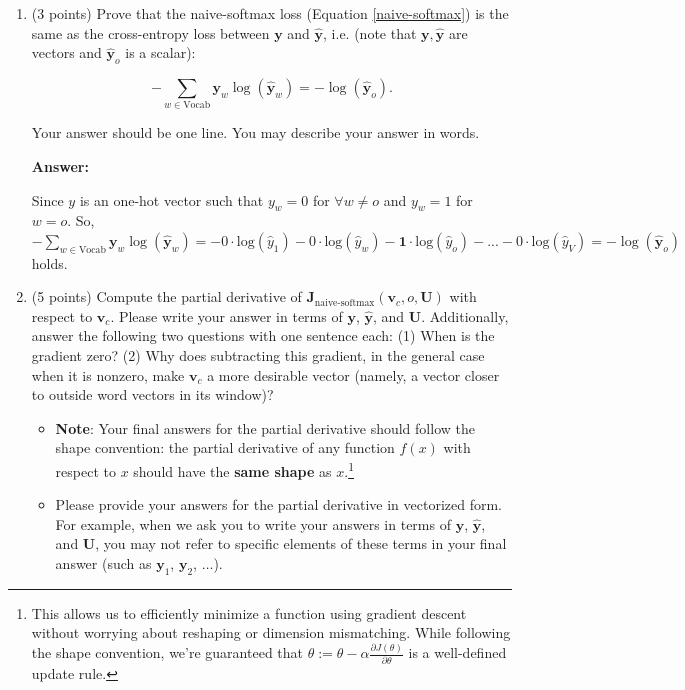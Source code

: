\documentclass{article}
\newenvironment{answer}{
    {\bf Answer:} \sf \begingroup\color{red}
}{\endgroup}%
\begin{document}
\clearpage 
\begin{enumerate}[label=(\alph*)]
\item (3 points) 
Prove that the naive-softmax loss (Equation \ref{naive-softmax}) is the same as the cross-entropy loss between $\bm y$ and $\hat{\bm y}$, i.e. (note that $\bm y, \hat{\bm y}$ are vectors and $\hat{\bm y}_o$ is a scalar):

\begin{equation}
-\sum_{w \in \text{Vocab}} \bm y_w \log(\hat{\bm y}_w) = - \log (\hat{\bm y}_o).
\end{equation}

Your answer should be one line. You may describe your answer in words.
\begin{shaded}
\begin{answer}
Since $y$ is an one-hot vector such that $y_w = 0$ for $\forall w \neq o$ and $y_w = 1$ for $w = o$. So, $-\sum_{w \in \text{Vocab}} \bm y_w \log(\hat{\bm y}_w) = - 0 \cdot \text{log} (\hat{y}_1) - 0 \cdot \text{log} (\hat{y}_w) - \bm 1 \cdot \text{log} (\hat{y}_o) - ... - 0 \cdot \text{log} (\hat{y}_V) = - \log (\hat{\bm y}_o)$ holds.
\end{answer}
\end{shaded}

\item (5 points) Compute the partial derivative of $\bm J_{\text{naive-softmax}}(\bm v_c, o, \bm U)$ with respect to $\bm v_c$. Please write your answer in terms of $\bm y$, $\hat{\bm y}$, and $\bm U$. Additionally, answer the following two questions with one sentence each: (1) When is the gradient zero? (2) Why does subtracting this gradient, in the general case when it is nonzero, make $\bm v_c$ a more desirable vector (namely, a vector closer to outside word vectors in its window)?

\begin{itemize} 
\item \textbf{Note}: Your final answers for the partial derivative should follow the shape convention: the partial derivative of any function $f(x)$ with respect to $x$ should have the \textbf{same shape} as $x$.\footnote{This allows us to efficiently minimize a function using gradient descent without worrying about reshaping or dimension mismatching. While following the shape convention, we're guaranteed that $\theta:= \theta - \alpha\frac{\partial J(\theta)}{\partial \theta}$ is a well-defined update rule.}
\item Please provide your answers for the partial derivative in vectorized form. For example, when we ask you to write your answers in terms of $\bm y$, $\hat{\bm y}$, and $\bm U$, you may not refer to specific elements of these terms in your final answer (such as $\bm y_1$, $\bm y_2$, $\dots$). 
\end{itemize}




\end{enumerate}
\end{document}
